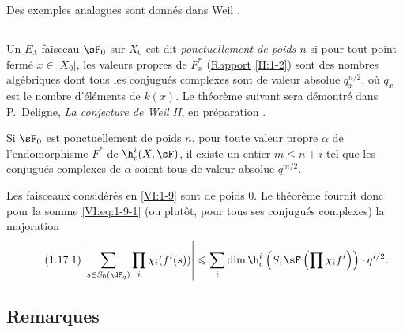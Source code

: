 Des exemples analogues sont donnés dans Weil \cite[App V, $3^\text{e}$ éd.]{we74}. 





\subsection{}\label{VI:1-16}

Un $E_\lambda$-faisceau $\sF_0$ sur $X_0$ est dit \emph{ponctuellement de 
poids $n$} si pour tout point fermé $x\in |X_0|$, les valeurs propres de 
$F_x^\ast$ (\hyperref[II]{Rapport} \ref{II:1-2}) sont des nombres algébriques 
dont tous les conjugués complexes sont de valeur absolue 
$q_x^{n/2}$, où $q_x$ est le nombre d'éléments de $k(x)$. Le théorème 
suivant sera démontré dans P.~Deligne, \emph{La conjecture de Weil II}, en préparation \cite{de80}. 





\begin{theorem_}\label{VI:1-17}
Si $\sF_0$ est ponctuellement de poids $n$, pour toute valeur propre $\alpha$ 
de l'endomorphisme $F^\ast$ de $\h_c^i(X,\sF)$, il existe un entier 
$m\leqslant n+i$ tel que les conjugués complexes de $\alpha$ soient tous de 
valeur absolue $q^{m/2}$.
\end{theorem_}

Les faisceaux considérés en \ref{VI:1-9} sont de poids $0$. Le théorème 
fournit donc pour la somme \ref{VI:eq:1-9-1} (ou plutôt, pour tous ses 
conjugués complexes) la majoration 
\begin{equation*}\tag{1.17.1}\label{VI:eq:1-17-1}
  \left|\sum_{s\in S_0(\dF_q)} \prod_i \chi_i(f^i(s)) \right| \leqslant \sum_i \dim \h_c^i\left(S,\sF\left(\prod \chi_i f^i\right)\right)\cdot q^{i/2} \text{.}
\end{equation*}





\subsection{Remarques}\label{VI:1-18}

